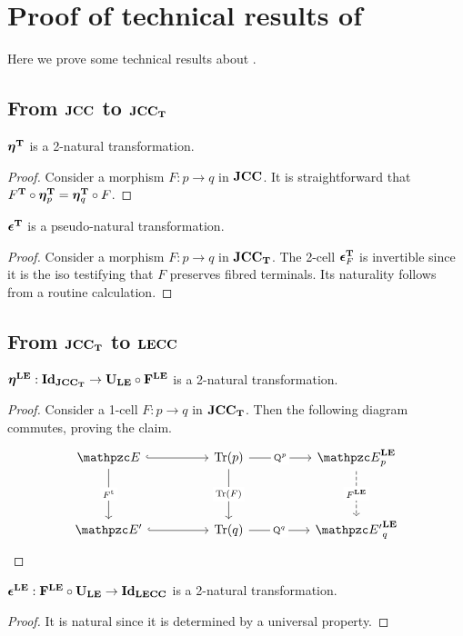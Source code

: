 \documentclass{lmcs} %
\theoremstyle{plain}\newtheorem{satz}[thm]{Satz} %
\begin{document}
\section{Proof of technical results of }\label{app:B}

Here we prove some technical results about .

\subsection{From $\mathbf{JCC}$ to $\mathbf{JCC_T}$}
\begin{lem}\label{lem:JTun-pseudonat}
	$\boldsymbol{\eta}^{\mathbf{T}}_{}$ is a 2-natural transformation.
\end{lem}

\begin{proof}
	Consider a morphism $F:p\to q$ in $\mathbf{JCC}$. It is straightforward that ${F}^{\mathbf{T}}\circ \boldsymbol{\eta}^{\mathbf{T}}_{p}=\boldsymbol{\eta}^{\mathbf{T}}_{q}\circ F$.
\end{proof}

\begin{lem}\label{lem:JTcoun-pseudonat}
	$\boldsymbol{\epsilon}^{\mathbf{T}}_{}$ is a pseudo-natural transformation.
\end{lem}

\begin{proof}
	Consider a morphism $F:p\to q$ in $\mathbf{JCC_T}$. The 2-cell $\boldsymbol{\epsilon}^{\mathbf{T}}_{F}$ is invertible since it is the iso testifying that $F$ preserves fibred terminals. Its naturality follows from a routine calculation.
\end{proof}

\subsection{From $\mathbf{JCC_T}$ to $\mathbf{LECC}$}

\begin{lem}\label{lem:LEun-nat}
	$\boldsymbol{\eta}^{\mathbf{LE}}_{}:\boldsymbol{\mathrm{Id}_{\mathbf{JCC_T}}}\to \mathbf{U_{LE}}\circ \mathbf{F^{LE}}$ is a 2-natural transformation.
\end{lem}

\begin{proof}
	Consider a 1-cell $F:p\to q$ in $\mathbf{JCC_T}$. Then the following diagram commutes, proving the claim.
	\[\begin{tikzcd}
		{\ct{E}} && {\Tr(p)} && {\LEDomE{p}} \\
		\\
		{\ct{E'}} && {\Tr(q)} && {\LEDom{\ct{E}'}{q}}
		\arrow[hook, from=1-1, to=1-3]
		\arrow["{\ft{F}}"{description}, from=1-1, to=3-1]
		\arrow["{{\quot{p}}}"{description}, from=1-3, to=1-5]
		\arrow["{\Tr(F)}"{description}, from=1-3, to=3-3]
		\arrow["{\LEFun{F}}"{description}, dashed, from=1-5, to=3-5]
		\arrow[hook, from=3-1, to=3-3]
		\arrow["{{\quot{q}}}"{description}, from=3-3, to=3-5]
	\end{tikzcd}\]
\end{proof}

\begin{lem}\label{lem:LEcoun-nat}
	$\boldsymbol{\epsilon}^{\mathbf{LE}}_{}:\mathbf{F^{LE}}\circ\mathbf{U_{LE}}\to \boldsymbol{\mathrm{Id}_{\mathbf{LECC}}}$ is a 2-natural transformation.
\end{lem}

\begin{proof}
	It is natural since it is determined by a universal property.
\end{proof}

		
\end{document}
